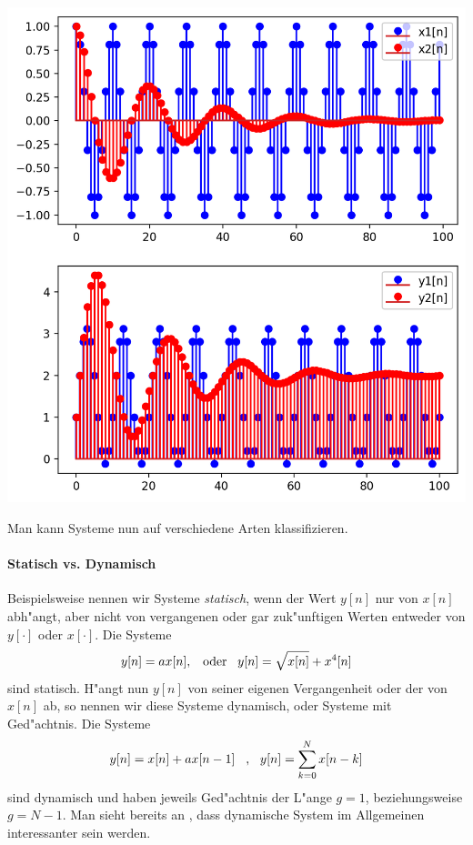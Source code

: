\begin{listing}
    \noindent
    \begin{minipage}{0.49\textwidth}
        \strut\vspace*{-\baselineskip}\newline
        \inputminted[firstline=4,lastline=18]{python3}{code/accumulator.py}
    \end{minipage}%
    \begin{minipage}{0.49\textwidth}
        \strut\vspace*{-\baselineskip}\newline
        \includegraphics[width=\textwidth]{code/accumulator.png}
    \end{minipage}%
    \label{py:accumulator}
\end{listing}

Man kann Systeme nun auf verschiedene Arten klassifizieren. 
\paragraph{Statisch vs. Dynamisch} Beispielsweise nennen wir Systeme \emph{statisch}, wenn der Wert $y[n]$ nur von $x[n]$ abh"angt, aber nicht von vergangenen oder gar zuk"unftigen Werten entweder von $y[\cdot]$ oder $x[\cdot]$.
Die Systeme
\[
y[n] = a x[n], {\hspace{3mm} \text{oder} \hspace{3mm}} y[n] = \sqrt{x[n]} + x^4[n]
\]
sind statisch.
H"angt nun $y[n]$ von seiner eigenen Vergangenheit oder der von $x[n]$ ab, so nennen wir diese Systeme dynamisch, oder Systeme mit Ged"achtnis.
Die Systeme
\[
y[n] = x[n] + a x[n-1] {\hspace{3mm} \text{,} \hspace{3mm}} y[n] = {\sum\limits_{k=0}^{N}{x[n-k]}}
\]
sind dynamisch und haben jeweils Ged"achtnis der L"ange $g = 1$, beziehungsweise $g = N-1$.
Man sieht bereits an , dass dynamische System im Allgemeinen interessanter sein werden.

